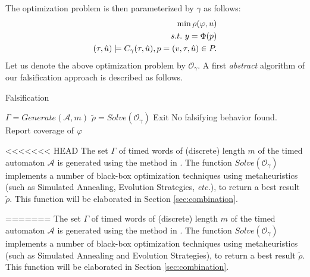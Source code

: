 The optimization problem is then parameterized by $\gamma$ as follows:
\begin{eqnarray} \label{eq:optim2}
\min \rho(\varphi, u) \\ \nonumber
s.t. ~y=\Phi(p) \\ \nonumber
(\tau, \hat{u}) \models C_{\gamma}(\tau, \hat{u}), p = (v, \tau, \hat{u}) \in P . \nonumber
\end{eqnarray}
Let us denote the above optimization problem by $\mathcal{O}_{\gamma}$. A first {\em abstract} algorithm of our falsification approach is described as follows.
\begin{algorithm}
\caption{Falsification}
\begin{algorithmic}
		\State $\Gamma = Generate(\mathcal{A},m)$
	        \ForAll{$\gamma \in \Gamma$} 
		\State $\tilde{\rho} = Solve(\mathcal{O}_{\gamma})$
		  \State Exit	
		\EndIf
		\EndFor
		\State No falsifying behavior found. Report coverage of $\varphi$
\end{algorithmic}
\end{algorithm}
<<<<<<< HEAD
The set $\Gamma$ of timed words of (discrete) length $m$ of the timed automaton $\mathcal{A}$ is generated using the method in \cite{BBBK16}. The function $Solve(\mathcal{O}_{\gamma})$ implements a number of black-box optimization techniques using metaheuristics (such as Simulated Annealing, Evolution Strategies, {\it etc.}), to return a best result $\tilde{\rho}$. This function will be elaborated in Section \ref{sec:combination}.



=======
The set $\Gamma$ of timed words of (discrete) length $m$ of the timed automaton $\mathcal{A}$ is generated using the method in \cite{Cosmos}. The function $Solve(\mathcal{O}_{\gamma})$ implements a number of black-box optimization techniques using metaheuristics (such as Simulated Annealing and Evolution Strategies), to return a best result $\tilde{\rho}$. This function will be elaborated in Section \ref{sec:combination}.



